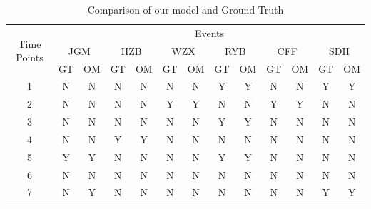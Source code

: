 \documentclass[runningheads]{llncs}
\begin{document}
\begin{table}[ht]
\caption{Comparison of our model and Ground Truth}\label{table:result}
\begin{center}
\begin{tabular}{|c|c|c|c|c|c|c|c|c|c|c|c|c|}
\hline
\multirow{3}{*}{Time Points} & \multicolumn{12}{c|}{Events}                                                                                                                                    \\ \cline{2-13} 
                             & \multicolumn{2}{c|}{JGM} & \multicolumn{2}{c|}{HZB} & \multicolumn{2}{c|}{WZX} & \multicolumn{2}{c|}{RYB} & \multicolumn{2}{c|}{CFF} & \multicolumn{2}{c|}{SDH} \\ \cline{2-13} 
                             & GT          & OM         & GT          & OM         & GT          & OM         & GT          & OM         & GT          & OM         & GT          & OM         \\ \hline
1                            & N           & N          & N           & N          & N           & N          & Y           & Y          & N           & N          & Y           & Y          \\
2                            & N           & N          & N           & N          & Y           & Y          & N           & N          & Y           & Y          & N           & N          \\
3                            & N           & N          & N           & N          & N           & N          & Y           & Y          & N           & N          & N           & N          \\
4                            & N           & N          & Y           & Y          & N           & N          & N           & N          & N           & N          & N           & N          \\
5                            & Y           & Y          & N           & N          & N           & N          & Y           & Y          & N           & N          & N           & N          \\
6                            & N           & N          & N           & N          & N           & N          & N           & N          & N           & N          & N           & N          \\
7                            & N           & Y          & N           & N          & N           & N          & N           & N          & N           & N          & Y           & Y          \\

\end{tabular}
\end{center}
\end{table}
\end{document}
